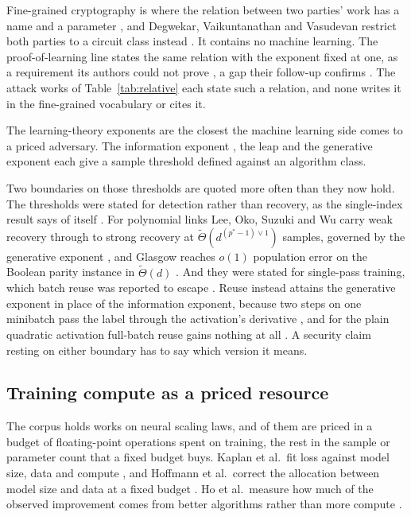 Fine-grained cryptography is where the relation between two parties' work has a
name and a parameter \cite{BC22,LLW19,BRSV17}, and Degwekar, Vaikuntanathan and
Vasudevan restrict both parties to a circuit class instead \cite{DVV16}. It contains
no machine learning. The proof-of-learning line states the same relation with the
exponent fixed at one, as a requirement its authors could not prove
\cite{JYCDTCP21}, a gap their follow-up confirms \cite{FJTYCDCP23}. The
\NumRelativeAttack{} attack works of Table~\ref{tab:relative} each state such a
relation, and none writes it in the fine-grained vocabulary or cites it.

The learning-theory exponents are the closest the machine learning side comes to a
priced adversary. The information exponent \cite{AGJ21}, the leap \cite{ABM23} and
the generative exponent \cite{DPLB24,DLB25} each give a sample threshold defined
against an algorithm class.

Two boundaries on those thresholds are quoted more often than they now hold. The
thresholds were stated for detection rather than recovery, as the single-index
result says of itself \cite{DPLB24}. For polynomial links Lee, Oko, Suzuki and Wu
carry weak recovery through to strong recovery at
$\tilde\Theta(d^{(p^*-1) \vee 1})$ samples, governed by the generative exponent
\cite{LOSW24}, and Glasgow reaches $o(1)$ population error on the Boolean parity
instance in $\tilde\Theta(d)$ \cite{Gla24}. And they were stated for single-pass
training, which batch reuse was reported to escape \cite{DTAPZK24}. Reuse instead
attains the generative exponent in place of the information exponent, because two
steps on one minibatch pass the label through the activation's derivative
\cite{LOSW24,TME25}, and for the plain quadratic activation full-batch reuse gains
nothing at all \cite{KJWSM26}. A security claim resting on either boundary has to
say which version it means.

\subsection{Training compute as a priced resource}

The corpus holds \NumScaling{} works on neural scaling laws, and \NumFlops{} of
them are priced in a budget of floating-point operations spent on training, the
rest in the sample or parameter count that a fixed budget buys. Kaplan et al.\ fit
loss against model size, data and compute \cite{KMHBCCGRWA20}, and Hoffmann et al.\
correct the allocation between model size and data at a fixed budget
\cite{HBMBCRCHWCHNMDDGOSERVS22}. Ho et al.\ measure how much of the observed
improvement comes from better algorithms rather than more compute
\cite{HBEORGATS24}.

